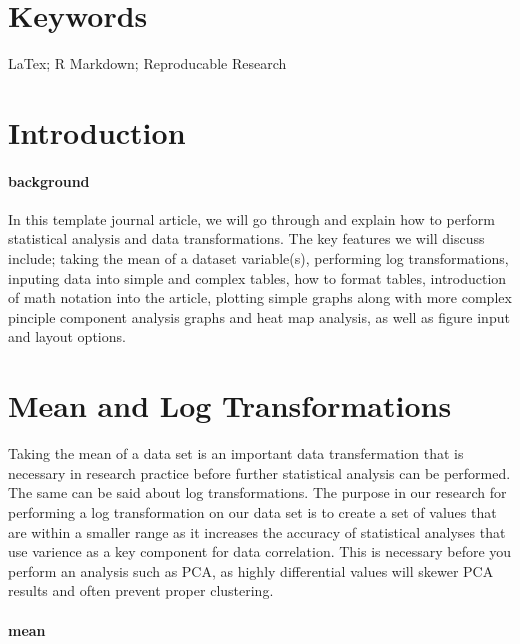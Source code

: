 \documentclass[]{elsarticle} %
\begin{document}
\hypertarget{keywords}{%
\section{Keywords}\label{keywords}}

LaTex; R Markdown; Reproducable Research

\hypertarget{introduction}{%
\section{Introduction}\label{introduction}}

\hypertarget{background}{%
\paragraph{background}\label{background}}

In this template journal article, we will go through and explain how to
perform statistical analysis and data transformations. The key features
we will discuss include; taking the mean of a dataset variable(s),
performing log transformations, inputing data into simple and complex
tables, how to format tables, introduction of math notation into the
article, plotting simple graphs along with more complex pinciple
component analysis graphs and heat map analysis, as well as figure input
and layout options.

\hypertarget{mean-and-log-transformations}{%
\section{Mean and Log
Transformations}\label{mean-and-log-transformations}}

Taking the mean of a data set is an important data transfermation that
is necessary in research practice before further statistical analysis
can be performed. The same can be said about log transformations. The
purpose in our research for performing a log transformation on our data
set is to create a set of values that are within a smaller range as it
increases the accuracy of statistical analyses that use varience as a
key component for data correlation. This is necessary before you perform
an analysis such as PCA, as highly differential values will skewer PCA
results and often prevent proper clustering.

\hypertarget{mean}{%
\paragraph{mean}\label{mean}}
\end{document}
